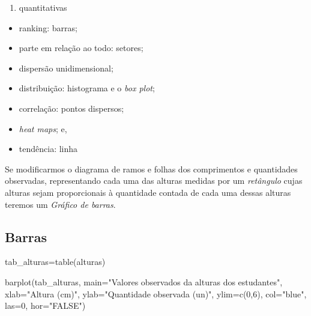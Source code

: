 \documentclass[
]{book}
\newenvironment{Shaded}{\begin{snugshade}}{\end{snugshade}}
\newcommand{\AttributeTok}[1]{\textcolor[rgb]{0.77,0.63,0.00}{#1}}
\newcommand{\DecValTok}[1]{\textcolor[rgb]{0.00,0.00,0.81}{#1}}
\newcommand{\FunctionTok}[1]{\textcolor[rgb]{0.00,0.00,0.00}{#1}}
\newcommand{\NormalTok}[1]{#1}
\newcommand{\OtherTok}[1]{\textcolor[rgb]{0.56,0.35,0.01}{#1}}
\newcommand{\StringTok}[1]{\textcolor[rgb]{0.31,0.60,0.02}{#1}}
\providecommand{\tightlist}{%
  \setlength{\itemsep}{0pt}\setlength{\parskip}{0pt}}
\begin{document}
\begin{enumerate}
\def\labelenumi{\arabic{enumi}.}
\setcounter{enumi}{1}
\tightlist
\item
  quantitativas
\end{enumerate}

\hfill\break

\begin{itemize}
\tightlist
\item
  ranking: barras;
\item
  parte em relação ao todo: setores;
\item
  dispersão unidimensional;
\item
  distribuição: histograma e o \emph{box plot};
\item
  correlação: pontos dispersos;
\item
  \emph{heat maps}; e,
\item
  tendência: linha
\end{itemize}

\hfill\break

Se modificarmos o diagrama de ramos e folhas dos comprimentos e quantidades observadas, representando cada uma das alturas medidas por um \emph{retângulo} cujas alturas sejam proporcionais à quantidade contada de cada uma dessas alturas teremos um \emph{Gráfico de barras}.

\hypertarget{barras}{%
\subsection{Barras}\label{barras}}

\hfill\break

\begin{Shaded}
\begin{Highlighting}[]
\NormalTok{tab\_alturas}\OtherTok{=}\FunctionTok{table}\NormalTok{(alturas)}

\FunctionTok{barplot}\NormalTok{(tab\_alturas,}
        \AttributeTok{main=}\StringTok{"Valores observados da alturas dos estudantes"}\NormalTok{,}
        \AttributeTok{xlab=}\StringTok{"Altura (cm)"}\NormalTok{,}
        \AttributeTok{ylab=}\StringTok{"Quantidade observada (un)"}\NormalTok{,}
        \AttributeTok{ylim=}\FunctionTok{c}\NormalTok{(}\DecValTok{0}\NormalTok{,}\DecValTok{6}\NormalTok{),}
        \AttributeTok{col=}\StringTok{"blue"}\NormalTok{,}
        \AttributeTok{las=}\DecValTok{0}\NormalTok{, }
        \AttributeTok{hor=}\StringTok{"FALSE"}\NormalTok{)}
\end{Highlighting}
\end{Shaded}
\end{document}
